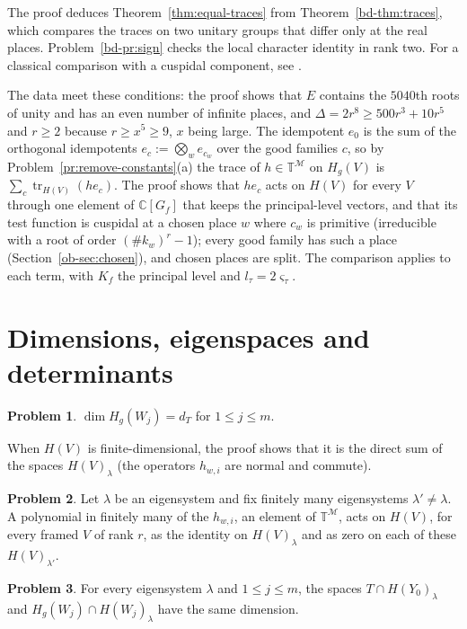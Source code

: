 \documentclass[reqno]{amsart}
\theoremstyle{plain}
\theoremstyle{definition}
\newtheorem{problem}{Problem}[section]
\newcommand{\C}{\mathbb{C}}
\newcommand{\TM}{\mathbb{T}^{\mathcal{M}}}
\newcommand{\tr}{\operatorname{tr}}
\begin{document}
The proof deduces Theorem~\ref{thm:equal-traces} from Theorem~\ref{bd-thm:traces}, which compares the traces on two unitary groups that differ only at the real places.  Problem~\ref{bd-pr:sign} checks the local character identity in rank two.  For a classical comparison with a cuspidal component, see \cite[Props.~1.10.5--1.10.6]{HL}.

The data meet these conditions: the proof shows that \(E\) contains the \(5040\)th roots of unity and has an even number of infinite places, and \(\Delta = 2r^8 \ge 500 r^3 + 10 r^5\) and \(r \ge 2\) because \(r \ge x^5 \ge 9\), \(x\) being large.  The idempotent \(e_0\) is the sum of the orthogonal idempotents \(e_c := \bigotimes_w e_{c_w}\) over the good families \(c\), so by Problem~\ref{pr:remove-constants}(a) the trace of \(h \in \TM\) on \(H_g(V)\) is \(\sum_c \tr_{H(V)}(h e_c)\).  The proof shows that \(h e_c\) acts on \(H(V)\) for every \(V\) through one element of \(\C[G_f]\) that keeps the principal-level vectors, and that its test function is cuspidal at a chosen place \(w\) where \(c_w\) is primitive (irreducible with a root of order \((\#k_w)^r - 1\)); every good family has such a place (Section~\ref{ob-sec:chosen}), and chosen places are split.  The comparison applies to each term, with \(K_f\) the principal level and \(l_\tau = 2\varsigma_\tau\).

\section{Dimensions, eigenspaces and determinants}\label{sec:corollary}

\begin{problem}\label{pr:dim}
\(\dim H_g(W_j) = d_T\) for \(1 \le j \le m\).
\end{problem}

When \(H(V)\) is finite-dimensional, the proof shows that it is the direct sum of the spaces \(H(V)_\lambda\) (the operators \(h_{w,i}\) are normal and commute).

\begin{problem}\label{pr:eigen-proj}
Let \(\lambda\) be an eigensystem and fix finitely many eigensystems \(\lambda' \ne \lambda\).  A polynomial in finitely many of the \(h_{w,i}\), an element of \(\TM\), acts on \(H(V)\), for every framed \(V\) of rank \(r\), as the identity on \(H(V)_\lambda\) and as zero on each of these \(H(V)_{\lambda'}\).
\end{problem}

\begin{problem}\label{pr:eigen}
For every eigensystem \(\lambda\) and \(1 \le j \le m\), the spaces \(T \cap H(Y_0)_\lambda\) and \(H_g(W_j) \cap H(W_j)_\lambda\) have the same dimension.
\end{problem}
\end{document}
